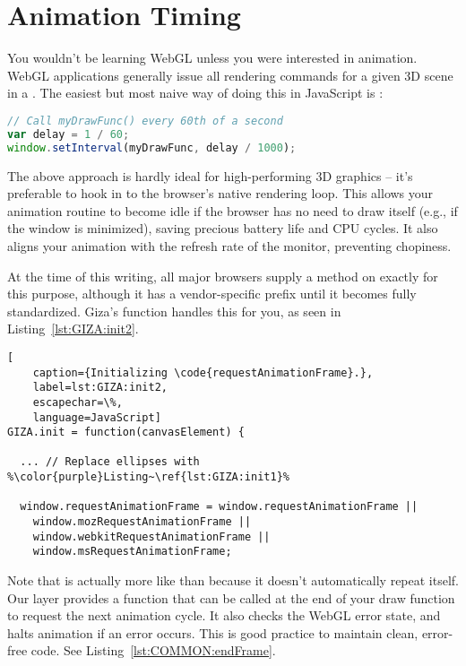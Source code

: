 \section{Animation Timing}

You wouldn't be learning WebGL unless you were interested in animation.  WebGL applications generally issue all rendering commands for a given 3D scene in a .  The easiest but most naive way of doing this in JavaScript is :

\begin{lstlisting}[language=JavaScript]
// Call myDrawFunc() every 60th of a second
var delay = 1 / 60;
window.setInterval(myDrawFunc, delay / 1000);
\end{lstlisting}

The above approach is hardly ideal for high-performing 3D graphics -- it's preferable to hook in to the browser's native rendering loop.  This allows your animation routine to become idle if the browser has no need to draw itself (e.g., if the window is minimized), saving precious battery life and CPU cycles.  It also aligns your animation with the refresh rate of the monitor, preventing chopiness.

At the time of this writing, all major browsers supply a method on  exactly for this purpose, although it has a vendor-specific prefix until it becomes fully standardized.  Giza's  function handles this for you, as seen in Listing~\ref{lst:GIZA:init2}.

\begin{lstlisting}[
    caption={Initializing \code{requestAnimationFrame}.},
    label=lst:GIZA:init2,
    escapechar=\%,
    language=JavaScript]
GIZA.init = function(canvasElement) {

  ... // Replace ellipses with %\color{purple}Listing~\ref{lst:GIZA:init1}%

  window.requestAnimationFrame = window.requestAnimationFrame ||
    window.mozRequestAnimationFrame ||
    window.webkitRequestAnimationFrame ||
    window.msRequestAnimationFrame;
\end{lstlisting} 

Note that  is actually more like  than  because it doesn't automatically repeat itself.  Our  layer provides a function that can be called at the end of your draw function to request the next animation cycle.  It also checks the WebGL error state, and halts animation if an error occurs.  This is good practice to maintain clean, error-free code.  See Listing~\ref{lst:COMMON:endFrame}.

